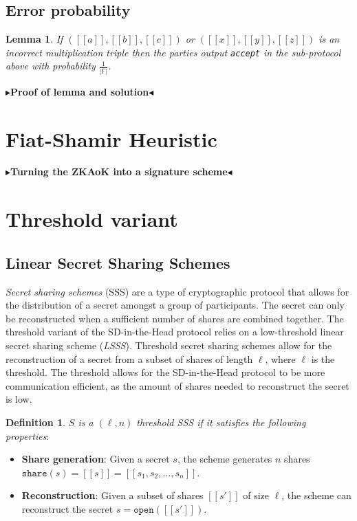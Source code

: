 \documentclass[twoside,11pt,openright]{report}
\theoremstyle{definition}
\newtheorem{definition}{Definition}[section]
\theoremstyle{plain}
\newtheorem{lemma}{Lemma}[section]
\newcommand{\todo}[1]{{\color[rgb]{.5,0,0}\textbf{$\blacktriangleright$#1$\blacktriangleleft$}}}
\begin{document}
\subsection{Error probability}

\begin{lemma}
  If $([[a]], [[b]], [[c]])$ or $([[x]], [[y]], [[z]])$ is an incorrect multiplication triple then the parties output \texttt{accept} in the sub-protocol above with probability $\frac{1}{|\mathbb{F}|}$.
\end{lemma}

\todo{Proof of lemma and solution}

\section{Fiat-Shamir Heuristic}
\label{sec:fiatshamir}

\todo{Turning the ZKAoK into a signature scheme}



\section{Threshold variant}

\subsection{Linear Secret Sharing Schemes}
\label{sec:lsss}

\textit{Secret sharing schemes} (SSS) are a type of cryptographic protocol that allows for the distribution of a secret amongst a group of participants. The secret can only be reconstructed when a sufficient number of shares are combined together. The threshold variant of the SD-in-the-Head protocol relies on a low-threshold linear secret sharing scheme (\textit{LSSS}). Threshold secret sharing schemes allow for the reconstruction of a secret from a subset of shares of length $\ell$, where $\ell$ is the threshold. The threshold allows for the SD-in-the-Head protocol to be more communication efficient, as the amount of shares needed to reconstruct the secret is low.

\begin{definition}
  \label{def:sss}
  \textit{$S$ is a $(\ell,n)$ threshold SSS if it satisfies the following properties}:

  \begin{itemize}
    \item \textbf{Share generation}: Given a secret $s$, the scheme generates $n$ shares $\texttt{share}(s) = [[s]] = [[s_1, s_2, \dots, s_n]]$.
    \item \textbf{Reconstruction}: Given a subset of shares $[[s']]$ of size $\ell$, the scheme can reconstruct the secret $s = \texttt{open}([[s']])$.
  \end{itemize}

\end{definition}
\end{document}
